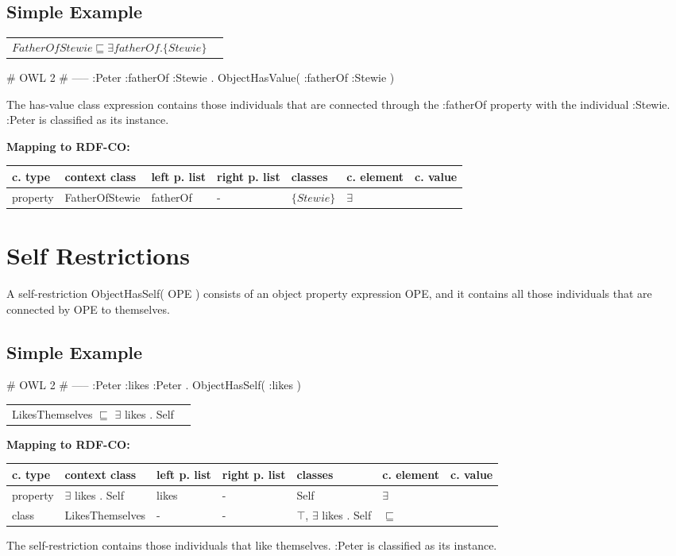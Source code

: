 \documentclass{llncs}
\newenvironment{gcotable}{
  \scriptsize
  \sffamily
  \vspace{0cm}
	\begin{center}
	\textbf{\vspace{0.4cm}Mapping to RDF-CO:} \\
  \begin{tabular}{l|l|l|l|l|l|l}
	\hline
  \textbf{c. type} & \textbf{context class} & \textbf{left p. list} & \textbf{right p. list} & \textbf{classes} & \textbf{c. element} & \textbf{c. value} \\
  \hline

}{
  \hline
  \end{tabular}
	\end{center}
}
\newenvironment{DL}{
  \vspace{0cm}
	\begin{center}
  \begin{tabular}{r l}

}{
  \end{tabular}
	\end{center}
}
\begin{document}
\subsection{Simple Example}

\begin{DL}
$FatherOfStewie \sqsubseteq \exists fatherOf.\{Stewie\}$
\end{DL}

\begin{ex}
# OWL 2
# -----
:Peter :fatherOf :Stewie . 
ObjectHasValue( :fatherOf :Stewie )
\end{ex}

The has-value class expression contains those individuals that are connected through the :fatherOf property with the individual :Stewie.
:Peter is classified as its instance.

\begin{gcotable}
property & FatherOfStewie & fatherOf & - & $\{Stewie\}$ & $\exists$ \\
\end{gcotable}

\section{Self Restrictions}

A self-restriction ObjectHasSelf( OPE ) consists of an object property expression OPE, and it contains all those individuals that are connected by OPE to themselves. 

\subsection{Simple Example}

\begin{ex}
# OWL 2
# -----
:Peter :likes :Peter . 
ObjectHasSelf( :likes ) 
\end{ex}

\begin{DL}
LikesThemselves $\sqsubseteq$ $\exists$ likes . Self
\end{DL}

\begin{gcotable}
property & $\exists$ likes . Self & likes & - & Self & $\exists$ \\
class & LikesThemselves & - & - & $\top$, $\exists$ likes . Self & $\sqsubseteq$ \\
\end{gcotable}

The self-restriction contains those individuals that like themselves.
:Peter is classified as its instance.
\end{document}
